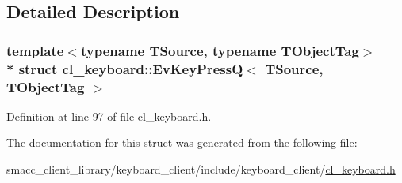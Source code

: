 \subsection{Detailed Description}
\subsubsection*{template$<$typename T\+Source, typename T\+Object\+Tag$>$\\*
struct cl\+\_\+keyboard\+::\+Ev\+Key\+Press\+Q$<$ T\+Source, T\+Object\+Tag $>$}



Definition at line 97 of file cl\+\_\+keyboard.\+h.



The documentation for this struct was generated from the following file\+:\begin{DoxyCompactItemize}
\item 
smacc\+\_\+client\+\_\+library/keyboard\+\_\+client/include/keyboard\+\_\+client/\hyperlink{cl__keyboard_8h}{cl\+\_\+keyboard.\+h}\end{DoxyCompactItemize}
